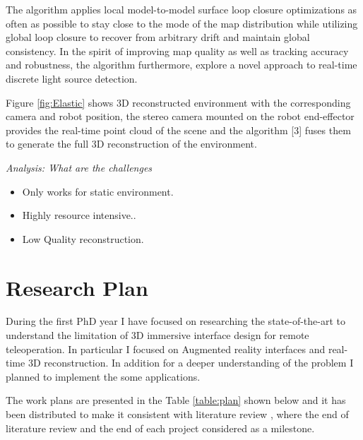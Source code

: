 The algorithm applies local model-to-model surface loop closure optimizations as often as possible to stay close to the mode of the map distribution while utilizing global loop closure to recover from arbitrary drift and maintain global consistency. In the spirit of improving map quality as well as tracking accuracy and robustness, the algorithm furthermore, explore a novel approach to real-time discrete light source detection.

Figure \ref{fig:Elastic} shows 3D reconstructed environment with the corresponding camera and robot position, the stereo camera mounted on the robot end-effector provides the real-time point cloud of the scene and   the algorithm [3] fuses them to generate the full 3D reconstruction of the environment.

\textit{Analysis: What are the challenges}
\begin{itemize}
    \item Only works for static environment.
    \item Highly resource intensive..
    \item Low Quality reconstruction.
\end{itemize}

\section{Research Plan}

During the first PhD year I have focused on researching the state-of-the-art to understand the limitation of 3D immersive interface design for remote teleoperation. In particular I focused on Augmented reality interfaces and real-time 3D reconstruction. In addition for a deeper understanding of the problem I planned to implement the some applications.

The work plans are presented in the Table \ref{table:plan} shown below and it has been distributed to make it consistent with literature review , where the end of literature review and the end of each project considered as a milestone.

